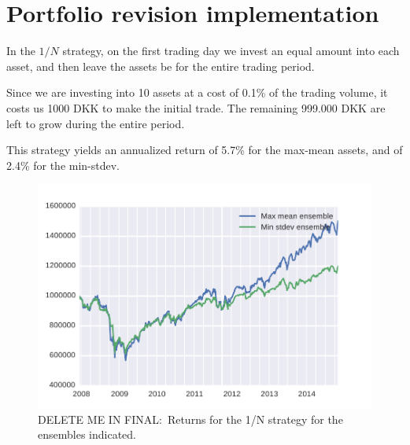 \section{Portfolio revision implementation}

In the $1/N$ strategy, on the first trading day we invest  an equal amount into each asset, and then leave the assets be for the entire trading period.

Since we are investing into 10 assets at a cost of 0.1\% of the trading volume, it costs us 1000 DKK to make the initial trade.
The remaining 999.000 DKK are left to grow during the entire period.

This strategy yields an annualized return of 5.7\% for the max-mean assets, and of 2.4\% for the min-stdev.


\begin{figure}[tp]
\centering
\includegraphics{../pic/returns_1overN_only.pdf}
\caption{DELETE ME IN FINAL:\ Returns for the 1/N strategy for the ensembles indicated.}
\label{fig:bondsyield}
\end{figure}
